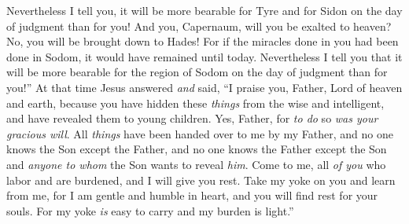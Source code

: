 \begin{biblechapter}
\verse Nevertheless I tell you, it will be more bearable for Tyre and for Sidon on the day of judgment than for you!
\verse And you, Capernaum, will you be exalted to heaven? No, you will be brought down to Hades! For if the miracles done in you had been done in Sodom, it would have remained until today.
\verse Nevertheless I tell you that it will be more bearable for the region of Sodom on the day of judgment than for you!”
 At that time Jesus answered \textit{and} said, “I praise you, Father, Lord of heaven and earth, because you have hidden these \textit{things} from the wise and intelligent, and have revealed them to young children.
\verse Yes, Father, for \textit{to do} so \textit{was your gracious will}.
\verse All \textit{things} have been handed over to me by my Father, and no one knows the Son except the Father, and no one knows the Father except the Son and \textit{anyone to whom} the Son wants to reveal \textit{him}.
\verse Come to me, all \textit{of you} who labor and are burdened, and I will give you rest.
\verse Take my yoke on you and learn from me, for I am gentle and humble in heart, and you will find rest for your souls.
\verse For my yoke \textit{is} easy to carry and my burden is light.”
\end{biblechapter}

